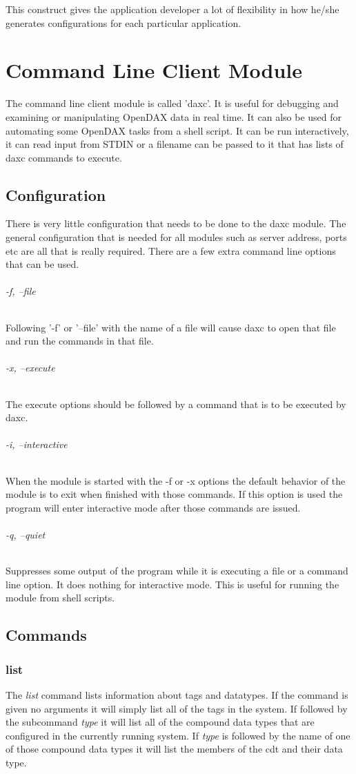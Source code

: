 This construct gives the application developer a lot of flexibility in how he/she generates configurations for each particular application.

\chapter{Command Line Client Module}
The command line client module is called 'daxc'.  It is useful for debugging and examining or manipulating OpenDAX data in real time.  It can also be used for automating some OpenDAX tasks from a shell script.  It can be run interactively, it can read input from STDIN or a filename can be passed to it that has lists of daxc commands to execute.

\section{Configuration}
There is very little configuration that needs to be done to the daxc module.  The general configuration that is needed for all modules such as server address, ports etc are all that is really required.  There are a few extra command line options that can be used.

\subparagraph*{-f, --file}
Following '-f' or '--file' with the name of a file will cause daxc to open that file and run the commands in that file.

\subparagraph*{-x, --execute}
The execute options should be followed by a command that is to be executed by daxc.

\subparagraph*{-i, --interactive}
When the module is started with the -f or -x options the default behavior of the module is to exit when finished with those commands.  If this option is used the program will enter interactive mode after those commands are issued.

\subparagraph*{-q, --quiet}
Suppresses some output of the program while it is executing a file or a command line option.  It does nothing for interactive mode.  This is useful for running the module from shell scripts. 

\section{Commands}

\subsection{list}
The \textit{list} command lists information about tags and datatypes.  If the command is given no arguments it will simply list all of the tags in the system.  If followed by the subcommand \textit{type} it will list all of the compound data types that are configured in the currently running system.  If \textit{type} is followed by the name of one of those compound data types it will list the members of the cdt and their data type.

